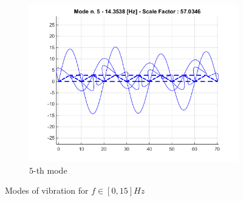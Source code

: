 \documentclass[10pt,a4paper,final]{report}
\begin{document}
\begin{figure}[h]
\begin{subfigure}[b]{0.3\textwidth}
                \includegraphics[width=\textwidth]{mode5}
                \caption{$5$-th mode}
                \label{fig:mode5}
        \end{subfigure}
        \caption{Modes of vibration for $f \in [0,15]Hz$} \label{fig:modes}
\end{figure}
\newpage
\end{document}
